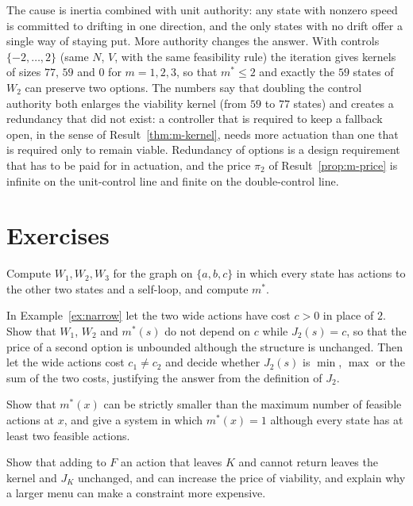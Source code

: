 The cause is inertia combined with unit authority: any state with nonzero speed is committed to drifting in one direction, and the only states with no drift offer a single way of staying put. More authority changes the answer. With controls $\{-2,\dots,2\}$ (same $N$, $V$, with the same feasibility rule) the iteration gives kernels of sizes $77$, $59$ and $0$ for $m=1,2,3$, so that $m^{*}\le2$ and exactly the $59$ states of $W_2$ can preserve two options. The numbers say that doubling the control authority both enlarges the viability kernel (from $59$ to $77$ states) and creates a redundancy that did not exist: a controller that is required to keep a fallback open, in the sense of Result~\ref{thm:m-kernel}, needs more actuation than one that is required only to remain viable. Redundancy of options is a design requirement that has to be paid for in actuation, and the price $\pi_2$ of Result~\ref{prop:m-price} is infinite on the unit-control line and finite on the double-control line.

\section*{Exercises}

\begin{exercise}
Compute $W_1,W_2,W_3$ for the graph on $\{a,b,c\}$ in which every state has actions to the other two states and a self-loop, and compute $m^{*}$.
\end{exercise}

\begin{exercise}
In Example~\ref{ex:narrow} let the two wide actions have cost $c>0$ in place of $2$. Show that $W_1$, $W_2$ and $m^{*}(s)$ do not depend on $c$ while $J_2(s)=c$, so that the price of a second option is unbounded although the structure is unchanged. Then let the wide actions cost $c_1\ne c_2$ and decide whether $J_2(s)$ is $\min$, $\max$ or the sum of the two costs, justifying the answer from the definition of $J_2$.
\end{exercise}

\begin{exercise}
Show that $m^{*}(x)$ can be strictly smaller than the maximum number of feasible actions at $x$, and give a system in which $m^{*}(x)=1$ although every state has at least two feasible actions.
\end{exercise}

\begin{exercise}\label{ex:more-menu}
Show that adding to $F$ an action that leaves $K$ and cannot return leaves the kernel and $J_K$ unchanged, and can increase the price of viability, and explain why a larger menu can make a constraint more expensive.
\end{exercise}

